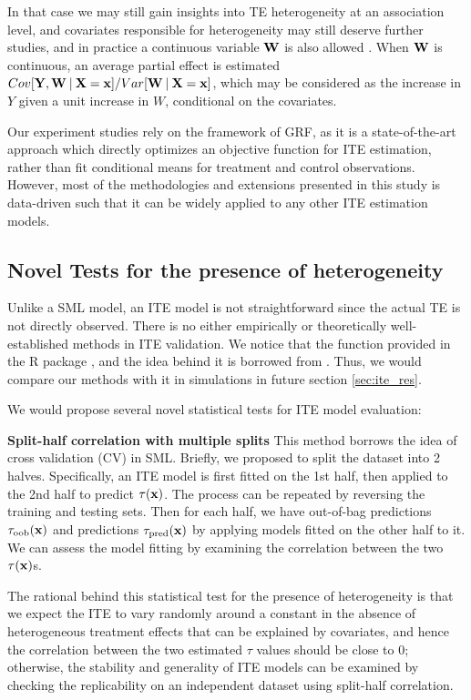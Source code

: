   In that case we may still gain insights into TE heterogeneity at an association level, and covariates responsible for heterogeneity may still deserve further studies, and in practice a continuous variable $\mathbf{W}$ is also allowed \cite{athey2019generalized}. When $\mathbf{W}$ is continuous, an average partial effect is estimated $Cov [\mathbf{Y},\mathbf{W} \:\vert\: \mathbf{X} = \mathbf{x}] / Var[\mathbf{W} \:\vert\: \mathbf{X} = \mathbf{x}]$, which may be considered as the increase in $Y$ given a unit increase in $W$, conditional on the covariates. 
  
  Our experiment studies rely on the framework of GRF, as it is a state-of-the-art approach which directly optimizes an objective function for ITE estimation, rather than fit conditional means for treatment and control observations. However, most of the methodologies and extensions presented in this study is data-driven such that it can be widely applied to any other ITE estimation models.

  \subsection{Novel Tests for the presence of heterogeneity}
  \label{sec:ite_novel_tests}
    Unlike a SML model, an ITE model is not straightforward since the actual TE is not directly observed. There is no either empirically or theoretically well-established methods in ITE validation. 
    We notice that the function  provided in the R package  \cite{tibshirani2018package}, and the idea behind it is borrowed from \cite{chernozhukov2018generic}. Thus,  we would compare our methods with it in simulations in future section \ref{sec:ite_res}.
    
    We would propose several novel statistical tests for ITE model evaluation:

    \textbf{Split-half correlation with multiple splits}  This method borrows the idea of cross validation (CV) in SML. Briefly, we proposed to split the dataset into 2 halves. Specifically, an ITE model is first fitted on the 1st half, then applied to the 2nd half to predict $\tau(\mathbf{x})$. The process can be repeated by reversing the training and testing sets. Then for each half, we have out-of-bag predictions $\tau_\mathrm{oob}(\mathbf{x})$ and predictions $\tau_\mathrm{pred}(\mathbf{x})$ by applying models fitted on the other half to it. We can assess the model fitting by examining the correlation between the two $\tau(\mathbf{x})$s.

    The rational behind this statistical test for the presence of heterogeneity is that we expect the ITE to vary randomly around a constant in the absence of heterogeneous treatment effects that can be explained by covariates, and hence the correlation between the two estimated $\tau$ values should be close to 0; otherwise, the stability and generality of ITE models can be examined by checking the replicability on an independent dataset using split-half correlation. 
    
